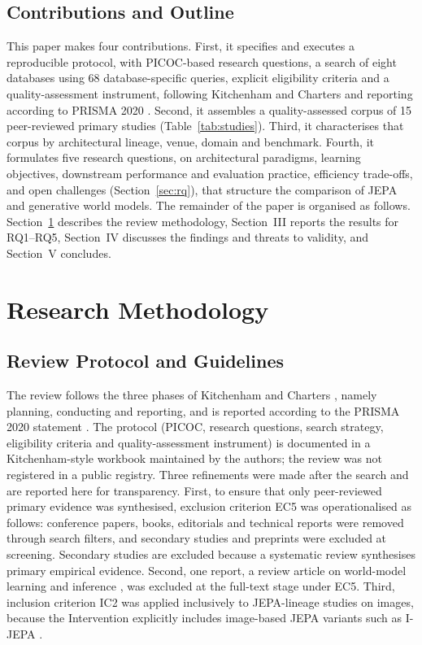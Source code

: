 \documentclass[conference,a4paper]{IEEEtran}
\begin{document}
\subsection{Contributions and Outline}
This paper makes four contributions. First, it specifies and executes a reproducible protocol, with PICOC-based research questions, a search of eight databases using 68 database-specific queries, explicit eligibility criteria and a quality-assessment instrument, following Kitchenham and Charters \cite{kitchenham2007guidelines} and reporting according to PRISMA 2020 \cite{page2021prisma}. Second, it assembles a quality-assessed corpus of 15 peer-reviewed primary studies (Table~\ref{tab:studies}). Third, it characterises that corpus by architectural lineage, venue, domain and benchmark. Fourth, it formulates five research questions, on architectural paradigms, learning objectives, downstream performance and evaluation practice, efficiency trade-offs, and open challenges (Section~\ref{sec:rq}), that structure the comparison of JEPA and generative world models. The remainder of the paper is organised as follows. Section~\ref{sec:method} describes the review methodology, Section~III reports the results for RQ1--RQ5, Section~IV discusses the findings and threats to validity, and Section~V concludes.

\section{Research Methodology}\label{sec:method}

\subsection{Review Protocol and Guidelines}
The review follows the three phases of Kitchenham and Charters \cite{kitchenham2007guidelines}, namely planning, conducting and reporting, and is reported according to the PRISMA 2020 statement \cite{page2021prisma}. The protocol (PICOC, research questions, search strategy, eligibility criteria and quality-assessment instrument) is documented in a Kitchenham-style workbook maintained by the authors; the review was not registered in a public registry. %
Three refinements were made after the search and are reported here for transparency. First, to ensure that only peer-reviewed primary evidence was synthesised, exclusion criterion EC5 was operationalised as follows: conference papers, books, editorials and technical reports were removed through search filters, and secondary studies and preprints were excluded at screening. Secondary studies are excluded because a systematic review synthesises primary empirical evidence. Second, one report, a review article on world-model learning and inference \cite{friston2021world}, was excluded at the full-text stage under EC5. Third, inclusion criterion IC2 was applied inclusively to JEPA-lineage studies on images, because the Intervention explicitly includes image-based JEPA variants such as I-JEPA \cite{assran2023ijepa}.
\end{document}
